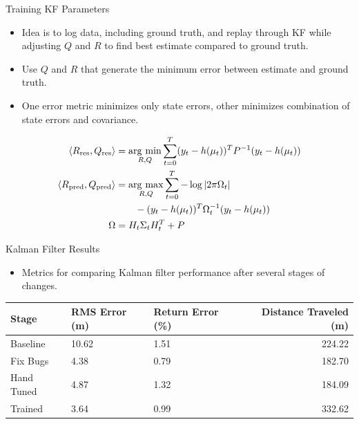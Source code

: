 \documentclass[hyperref={pdfpagelabels=false}]{beamer}
\begin{document}
\begin{frame}{Training KF Parameters}
\begin{itemize}
\item Idea is to log data, including ground truth, and replay through KF while adjusting $Q$ and $R$ to find best estimate compared to ground truth.
\item Use $Q$ and $R$ that generate the minimum error between estimate and ground truth.
\item One error metric minimizes only state errors, other minimizes combination of state errors and covariance.
\end{itemize}
\begin{align*}
\left<R_{\text{res}},Q_{\text{res}}\right> &= \mathop{\arg\,\min}\limits_{R,Q}\sum_{t=0}^T (y_t-h(\mu_t))^TP^{-1}(y_t-h(\mu_t)) \\
\left<R_{\text{pred}},Q_{\text{pred}}\right> &= \mathop{\arg\,\max}\limits_{R,Q}\sum_{t=0}^T -\log|2\pi\Omega_t| \\
&\qquad - (y_t-h(\mu_t))^T\Omega_t^{-1}(y_t-h(\mu_t)) \\
\Omega &= H_t\Sigma_tH_t^T+P
\end{align*}
\end{frame}

\begin{frame}{Kalman Filter Results}
\begin{itemize}
\item Metrics for comparing Kalman filter performance after several stages of changes.
\end{itemize}
\begin{table}[ht!]
\small
\centering
\begin{tabular}{@{}lllr@{}} \toprule
Stage      & RMS Error (m)  & Return Error (\%) & Distance Traveled (m) \\ \midrule
Baseline   & 10.62          & 1.51              & 224.22 \\
Fix Bugs   & 4.38           & 0.79              & 182.70 \\
Hand Tuned & 4.87           & 1.32              & 184.09 \\
Trained    & 3.64           & 0.99              & 332.62 \\ \bottomrule
\end{tabular}
\label{tab:resultsKF}
\end{table}
\end{frame}
\end{document}
